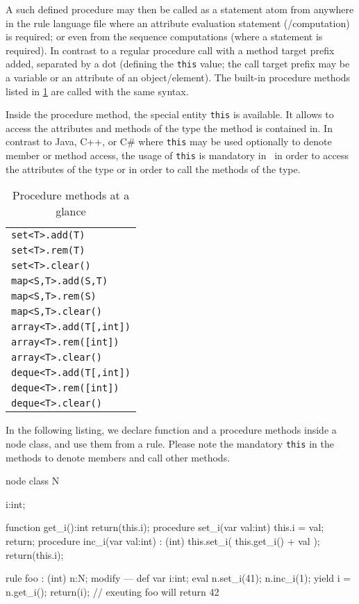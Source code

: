 A such defined procedure may then be called as a statement atom from anywhere in the rule language file where an attribute evaluation statement (/computation) is required; or even from the sequence computations (where a statement is required).
In contrast to a regular procedure call with a method target prefix added, separated by a dot (defining the \texttt{this} value; the call target prefix may be a variable or an attribute of an object/element).
The built-in procedure methods listed in \ref{procmethstab} are called with the same syntax.

Inside the procedure method, the special entity \texttt{this} is available.
It allows to access the attributes and methods of the type the method is contained in.
In contrast to Java, C++, or C\# where \texttt{this} may be used optionally to denote member or method access,
the usage of \texttt{this} is mandatory in \GrG~in order to access the attributes of the type or in order to call the methods of the type.


\begin{table}[htbp]
\centering
\begin{tabular}{|l|}
\hline
\texttt{set<T>.add(T)}\\
\texttt{set<T>.rem(T)}\\
\texttt{set<T>.clear()}\\
\hline
\texttt{map<S,T>.add(S,T)}\\
\texttt{map<S,T>.rem(S)}\\
\texttt{map<S,T>.clear()}\\
\hline
\texttt{array<T>.add(T[,int])}\\
\texttt{array<T>.rem([int])}\\
\texttt{array<T>.clear()}\\
\hline
\texttt{deque<T>.add(T[,int])}\\
\texttt{deque<T>.rem([int])}\\
\texttt{deque<T>.clear()}\\
\hline
\end{tabular}
\caption{Procedure methods at a glance}
\label{procmethstab}
\end{table}


\begin{example}
In the following listing, we declare function and a procedure methods inside a node class, and use them from a rule.
Please note the mandatory \texttt{this} in the methods to denote members and call other methods.
	\begin{grgen}
node class N
{
	i:int;
	
	function get_i():int
	{
		return(this.i);
	}
	procedure set_i(var val:int)
	{
		this.i = val;
		return;
	}
	procedure inc_i(var val:int) : (int)
	{
		this.set_i( this.get_i() + val );
		return(this.i);
	}
}

rule foo : (int)
{
	n:N;
	modify {
	---
		def var i:int;
		eval {
			n.set_i(41);
			n.inc_i(1);
			yield i = n.get_i();
		}
		return(i); // exeuting foo will return 42
	}
}
	\end{grgen}
\end{example}


